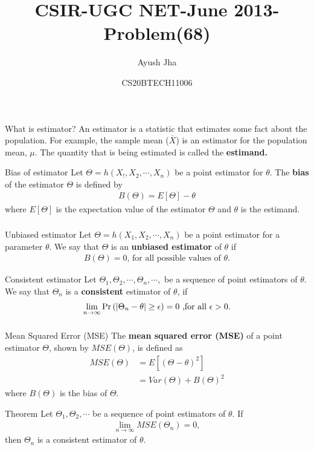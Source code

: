 \documentclass{beamer}
\title{CSIR-UGC NET-June 2013-Problem(68)}
\author{Ayush Jha}
\date{CS20BTECH11006}
\providecommand{\brak}[1]{\ensuremath{\left(#1\right)}}
\begin{document}
\begin{frame}
\titlepage
\end{frame}
\begin{frame}
\frametitle{}
\begin{block}{What is estimator?}
An estimator is a statistic that estimates some fact about the population. For example, the sample mean ($\bar{X}$) is an estimator for the population mean, $ \mu$.
The quantity that is being estimated is called the \textbf{estimand.} 
\end{block}
\begin{block}{Bias of estimator}
Let $ \Theta = h(X_!,X_2, \cdots, X_n) $  be a point estimator for $ \theta$. The \textbf{bias} of the estimator $ \Theta $ is defined by 
\begin{align}
    B(\Theta ) = E[\Theta ] - \theta
\end{align}
where $ E[\Theta ]$ is the expectation value of the estimator $ \Theta $ and $ \theta$ is the estimand. 
\end{block}
\end{frame}

\begin{frame}
\frametitle{}
\begin{block}{Unbiased estimator}
 Let $\Theta = h(X_1,X_2, \cdots , X_n) $ be a point estimator for a parameter $ \theta $. We say that $ \Theta $ is an \textbf{unbiased estimator} of $ \theta $ if
    \begin{align}
       B(\Theta )= 0 \text{, for all possible values of $\theta$.}
    \end{align}
\end{block}
\begin{block}{Consistent estimator}
 Let $ \Theta_1,\Theta_2, \cdots, \Theta_n , \cdots, $  be a sequence of point estimators of $ \theta $. We say that $ \Theta_n $ is a \textbf{consistent} estimator of $ \theta $, if 
\begin{align}
    \lim_{n\to\infty} \Pr\brak{| \Theta_n - \theta | \ge \epsilon} = 0 \text{ ,for all $ \epsilon > 0$.}
\end{align}
\end{block}
\end{frame}

\begin{frame}
\frametitle{}
\begin{block}{Mean Squared Error (MSE)}
 The \textbf{mean squared error (MSE)} of a point estimator $ \Theta $, shown by $ MSE(\Theta) $, is defined as
\begin{align}
    MSE(\Theta ) &= E[(\Theta - \theta)^2] \\
    &= Var(\Theta) + B(\Theta)^2
\end{align}
where $ B(\Theta ) $ is the bias of $ \Theta $. 
\end{block}
\begin{block}{Theorem}
  Let $ \Theta_1,\Theta_2 , \cdots$ be a sequence of point estimators of $ \theta $. If
\begin{align}
     \lim_{n\to\infty} MSE( \Theta_n) = 0,
\end{align}
then $ \Theta_n $ is a consistent estimator of $ \theta$.
\end{block}
\end{frame}
\end{document}
